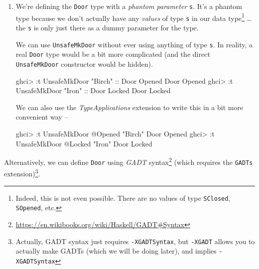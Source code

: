 \documentclass[]{article}
\newenvironment{Shaded}{}{}
\newcommand{\DataTypeTok}[1]{\textcolor[rgb]{0.56,0.13,0.00}{#1}}
\newcommand{\NormalTok}[1]{#1}
\newcommand{\OperatorTok}[1]{\textcolor[rgb]{0.40,0.40,0.40}{#1}}
\newcommand{\OtherTok}[1]{\textcolor[rgb]{0.00,0.44,0.13}{#1}}
\newcommand{\StringTok}[1]{\textcolor[rgb]{0.25,0.44,0.63}{#1}}
\renewcommand{\href}[2]{#2\footnote{\url{#1}}}
\begin{document}
\begin{enumerate}
\def\labelenumi{\arabic{enumi}.}
\setcounter{enumi}{2}
\item
  We're defining the \texttt{Door} type with a \emph{phantom parameter}
  \texttt{s}. It's a phantom type because we don't actually have any
  \emph{values} of type \texttt{s} in our data type\footnote{Indeed, this is not
    even possible. There are no values of type
    \texttt{\textquotesingle{}SClosed}, \texttt{\textquotesingle{}SOpened}, etc.}
  \ldots the \texttt{s} is only just there as a dummy parameter for the type.

  We can use \texttt{UnsafeMkDoor} without ever using anything of type
  \texttt{s}. In reality, a real \texttt{Door} type would be a bit more
  complicated (and the direct \texttt{UnsafeMkDoor} constructor would be
  hidden).

\begin{Shaded}
\begin{Highlighting}[]
\NormalTok{ghci}\OperatorTok{>} \OperatorTok{:}\NormalTok{t }\DataTypeTok{UnsafeMkDoor} \StringTok{"Birch"}\OtherTok{ ::} \DataTypeTok{Door} \DataTypeTok{\textquotesingle{}Opened}
\DataTypeTok{Door} \DataTypeTok{\textquotesingle{}Opened}
\NormalTok{ghci}\OperatorTok{>} \OperatorTok{:}\NormalTok{t }\DataTypeTok{UnsafeMkDoor} \StringTok{"Iron"}\OtherTok{ ::} \DataTypeTok{Door} \DataTypeTok{\textquotesingle{}Locked}
\DataTypeTok{Door} \DataTypeTok{\textquotesingle{}Locked}
\end{Highlighting}
\end{Shaded}

  We can also use the \emph{TypeApplications} extension to write this in a bit
  more convenient way --

\begin{Shaded}
\begin{Highlighting}[]
\NormalTok{ghci}\OperatorTok{>} \OperatorTok{:}\NormalTok{t }\DataTypeTok{UnsafeMkDoor} \OperatorTok{@}\DataTypeTok{\textquotesingle{}Opened} \StringTok{"Birch"}
\DataTypeTok{Door} \DataTypeTok{\textquotesingle{}Opened}
\NormalTok{ghci}\OperatorTok{>} \OperatorTok{:}\NormalTok{t }\DataTypeTok{UnsafeMkDoor} \OperatorTok{@}\DataTypeTok{\textquotesingle{}Locked} \StringTok{"Iron"}
\DataTypeTok{Door} \DataTypeTok{\textquotesingle{}Locked}
\end{Highlighting}
\end{Shaded}
\end{enumerate}

Alternatively, we can define \texttt{Door} using
\href{https://en.wikibooks.org/wiki/Haskell/GADT\#Syntax}{\emph{GADT} syntax}
(which requires the \texttt{GADTs} extension)\footnote{Actually, GADT syntax
  just requires \texttt{-XGADTSyntax}, but \texttt{-XGADT} allows you to
  actually make GADTs (which we will be doing later), and implies
  \texttt{-XGADTSyntax}}.
\end{document}

